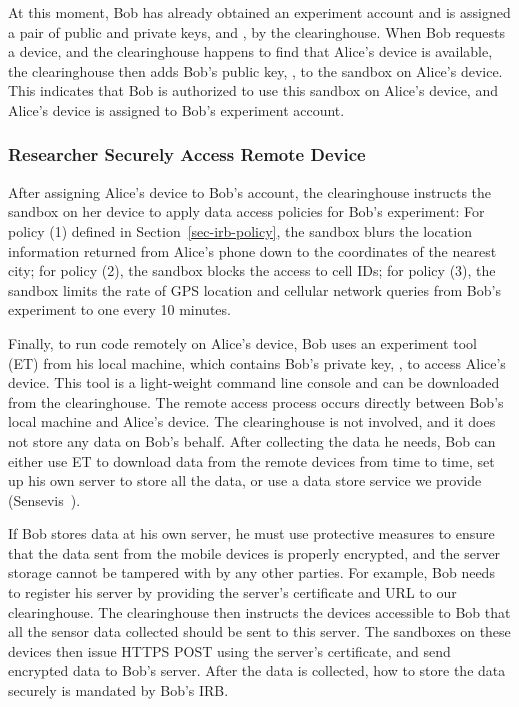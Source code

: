 At this moment, Bob has already obtained an experiment account
and is assigned a pair of public and private keys,
 and , by the
clearinghouse. When Bob requests a device, and the clearinghouse
happens to find that Alice's device is available, the
clearinghouse then adds Bob's public key, , to
the sandbox on Alice's device. This indicates that Bob is
authorized to use this sandbox on Alice's device, and Alice's
device is assigned to Bob's experiment account.

\subsubsection{Researcher Securely Access Remote Device}

After assigning Alice's device to Bob's account, the
clearinghouse instructs the sandbox on her device to apply data
access policies for Bob's experiment: For policy (1) defined in
Section~\ref{sec-irb-policy}, the sandbox blurs the location
information returned from Alice's phone down to the coordinates
of the nearest city; for policy (2), the sandbox blocks the
access to cell IDs; for policy (3), the sandbox limits the rate
of GPS location and cellular network queries from Bob's
experiment to one every 10 minutes.

Finally, to run code remotely on Alice's device, Bob uses an
experiment tool (ET) from his local machine, which contains
Bob's private key, , to access Alice's
device. This tool is a light-weight command line console and can
be downloaded from the clearinghouse. The remote access process
occurs directly between Bob's local machine and Alice's device.
The clearinghouse is not involved, and it does not store any
data on Bob's behalf. After collecting the data he needs, Bob
can either use ET to download data from the remote devices from
time to time, set up his own server to store all the data, or
use a data store service we provide (Sensevis~\cite{sensevis}).

If Bob stores data at his own server, he must use protective
measures to ensure that the data sent from the mobile devices is
properly encrypted, and the server storage cannot be tampered
with by any other parties. For example, Bob needs to register
his server by providing the server's certificate and URL to our
clearinghouse. The clearinghouse then instructs the devices
accessible to Bob that all the sensor data collected should be
sent to this server. The sandboxes on these devices then issue
HTTPS POST using the server's certificate, and send encrypted
data to Bob's server. After the data is collected, how to store
the data securely is mandated by Bob's IRB.
